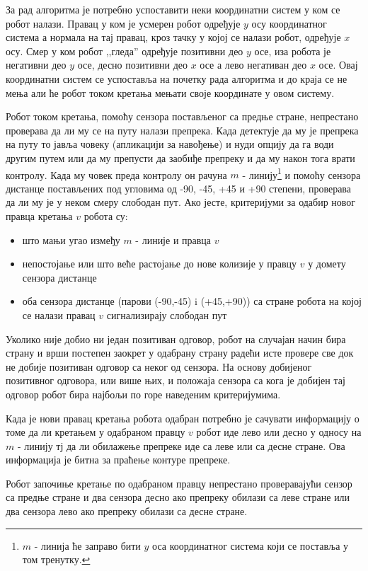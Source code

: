 \documentclass[12pt,oneside]{memoir}
\theoremstyle{remark}
\begin{document}
За рад алгоритма је потребно успоставити неки координатни систем у ком се робот налази. Правац у ком је усмерен робот одређује $y$ осу координатног система а нормала на тај правац, кроз тачку у којој се налази робот, одређује $x$ осу. Смер у ком робот ,,гледа'' одређује позитивни део $y$ осе, иза робота је негативни део $y$ осе, десно позитивни део $x$ осе а лево негативан део $x$ осе. Овај координатни систем се успоставља на почетку рада алгоритма и до краја се не мења али ће робот током кретања мењати своје координате у овом систему.

Робот током кретања, помоћу сензора постављеног са предње стране, непрестано проверава да ли му се на путу налази препрека. Када детектује да му је препрека на путу то јавља човеку (апликацији за навођење) и нуди опцију да га води другим путем или да му препусти да заобиђе препреку и да му након тога врати контролу. Када му човек преда контролу он рачуна $m$ - линију\footnote{$m$ - линија ће заправо бити $y$ оса координатног система који се поставља у том тренутку.} и помоћу сензора дистанце постављених под угловима од -90, -45, +45 и +90 степени, проверава да ли му је у неком смеру слободан пут. Ако јесте, критеријуми за одабир новог правца кретања $v$ робота су:
\begin{itemize}
\item што мањи угао између $m$ - линије и правца $v$
\item непостојање или што веће растојање до нове колизије у правцу $v$ у домету сензора дистанце
\item оба сензора дистанце (парови (-90,-45) i (+45,+90)) са стране робота на којој се налази правац $v$  сигнализирају слободан пут
\end{itemize}

Уколико није добио ни један позитиван одговор, робот на случајан начин бира страну и врши постепен заокрет у одабрану страну радећи исте провере све док не добије позитиван одговор са неког од сензора. На основу добијеног позитивног одговора, или више њих, и положаја сензора са кога је добијен тај одговор робот бира најбољи по горе наведеним критеријумима.

Када је нови правац кретања робота одабран потребно је сачувати информацију о томе да ли кретањем у одабраном правцу $v$ робот иде лево или десно у односу на $m$ - линију тј да ли обилажење препреке иде са леве или са десне стране. Ова информација је битна за праћење контуре препреке.

Робот започиње кретање по одабраном правцу непрестано проверавајући сензор са предње стране и два сензора десно ако препреку обилази са леве стране или два сензора лево ако препреку обилази са десне стране. 
\end{document}
